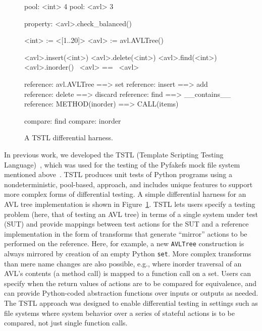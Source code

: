 \begin{figure}
\begin{code}
pool: <int> 4
pool: <avl> 3

property: <avl>.check\_balanced()

<int> := <[1..20]>
<avl> := avl.AVLTree()

<avl>.insert(<int>)
<avl>.delete(<int>)
<avl>.find(<int>)
<avl>.inorder()
~<avl> == ~<avl>

reference: avl.AVLTree ==> set
reference: insert ==> add
reference: delete ==> discard
reference: find ==> \_\_contains\_\_
reference: METHOD(inorder) ==> CALL(items)

compare: find
compare: inorder
\end{code}
\caption{A TSTL differential harness.}
\label{fig:avl}
\end{figure}

In previous work, we developed the TSTL (Template Scripting Testing
Language)~\cite{NFM15,tstlsttt}, which was used for the testing of the
Pyfakefs mock file system mentioned
above~\cite{pyfakefs,TSTLHarness}.  TSTL produces unit tests of Python
programs using a nondeterministic, pool-based, approach, and includes
unique features to support more complex forms of differential testing.  A simple
differential harness for an AVL tree implementation is shown in
Figure~\ref{fig:avl}.  TSTL lets users specify a testing problem
(here, that of testing an AVL tree) in terms of a single system under
test (SUT) and provide mappings between test actions for the SUT and a
reference implementation in the form of transforms that generate
``mirror'' actions to be performed on the reference.  Here, for
example, a new {\tt AVLTree} construction is always mirrored by
creation of an empty Python {\tt set}.  More complex transforms than
mere name changes are also possible, e.g., where inorder traversal of
an AVL's contents (a method call) is mapped to a function call on a
set.  Users can specify when the return values of actions are to be
compared for equivalence, and can provide Python-coded abstraction
functions over inputs or outputs as needed.  The TSTL approach was
designed to enable differential testing in settings such as file
systems where system behavior over a series of stateful actions is to
be compared, not just single function calls.

